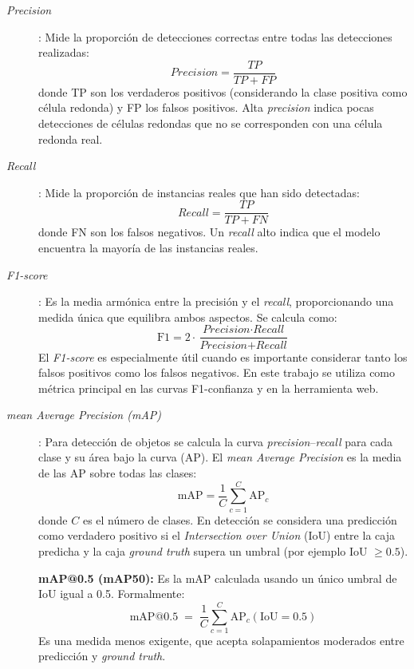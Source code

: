 \documentclass[12pt,a4paper,onecolumn,oneside]{report}
\begin{document}
\begin{description}
  \item[\textit{Precision}]: Mide la proporción de detecciones correctas entre todas las detecciones realizadas:
  \[
    \mathrm{\textit{Precision}} = \frac{TP}{TP + FP}
  \]
  donde TP son los verdaderos positivos (considerando la clase positiva como célula redonda) y FP los falsos positivos. Alta \textit{precision} indica pocas detecciones de células redondas 
  que no se corresponden con una célula redonda real.

  \item[\textit{Recall}]: Mide la proporción de instancias reales que han sido detectadas:
  \[
    \mathrm{\textit{Recall}} = \frac{TP}{TP + FN}
  \]
  donde FN son los falsos negativos. Un \textit{recall} alto indica que el modelo encuentra la mayoría de las instancias reales.

  \item[\textit{F1-score}]: Es la media armónica entre la precisión y el \textit{recall}, proporcionando una medida única que equilibra ambos aspectos. Se calcula como:
  \[
    \mathrm{F1} = 2 \cdot \frac{\mathrm{\textit{Precision}} \cdot \mathrm{\textit{Recall}}}{\mathrm{\textit{Precision}} + \mathrm{\textit{Recall}}}
  \]
  El \textit{F1-score} es especialmente útil cuando es importante considerar tanto los falsos positivos como los falsos negativos. En este trabajo se utiliza como métrica principal en las curvas F1-confianza y en la herramienta web.

  \item[\textit{mean Average Precision (mAP)}]: Para detección de objetos se calcula la curva \textit{precision}–\textit{recall} para cada clase y su área bajo la curva (AP). El \textit{mean Average Precision} es la media de las AP sobre todas las clases:
  \[
    \mathrm{mAP} = \frac{1}{C}\sum_{c=1}^{C} \mathrm{AP}_c
  \]
  donde $C$ es el número de clases. En detección se considera una predicción como verdadero positivo si el \textit{Intersection over Union} (IoU) entre la caja predicha y la caja \textit{ground truth} supera un umbral (por ejemplo IoU $\geq 0.5$). 

  \medskip

  \noindent\textbf{mAP@0.5 (mAP50):} Es la mAP calculada usando un único umbral de IoU igual a 0.5. Formalmente:
  \[
    \mathrm{mAP@0.5} \;=\; \frac{1}{C}\sum_{c=1}^{C} \mathrm{AP}_c(\mathrm{IoU}=0.5)
  \]
  Es una medida menos exigente, que acepta solapamientos moderados entre predicción y \textit{ground truth}.


\end{description}
\end{document}
